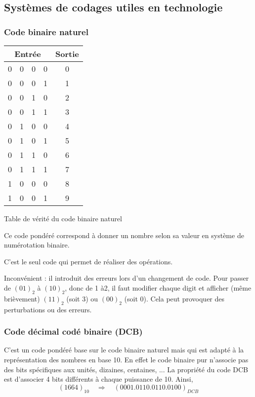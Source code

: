 \subsection{Systèmes de codages utiles en technologie} 

\subsubsection{Code binaire naturel}

\begin{margintable}
\begin{tabular}{|c|c|c|c||c|}
\hline
\multicolumn{4}{|c||}{Entrée} & Sortie \\ \hline \hline
0 & 0 & 0 & 0 & 0 \\ \hline 
0 & 0 & 0 & 1 & 1 \\ \hline
0 & 0 & 1 & 0 & 2 \\ \hline
0 & 0 & 1 & 1 & 3 \\ \hline
0 & 1 & 0 & 0 & 4 \\ \hline
0 & 1 & 0 & 1 & 5 \\ \hline
0 & 1 & 1 & 0 & 6 \\ \hline
0 & 1 & 1 & 1 & 7 \\ \hline
1 & 0 & 0 & 0 & 8 \\ \hline
1 & 0 & 0 & 1 & 9 \\ \hline
\end{tabular}
\caption{Table de vérité du code binaire naturel}

\end{margintable}


Ce code pondéré correspond à donner un nombre selon sa valeur en système de numérotation binaire. 

C'est le seul code qui permet de réaliser des opérations. 

Inconvénient : il introduit des erreurs lors d'un changement de code. Pour passer de $(01)_2$ à $(10)_2$, donc de 1 à2, il faut modifier chaque digit et afficher (même brièvement) $(11)_2$ (soit 3) ou $(00)_2$ (soit 0). Cela peut provoquer des perturbations ou des erreurs. 


%



\subsubsection{Code décimal codé binaire (DCB)}
C'est un code pondéré base sur le code binaire naturel mais qui est adapté à la représentation des nombres en base 10. En effet le code binaire pur n'associe pas des bits spécifiques aux unités, dizaines, centaines, ... La propriété du code DCB est d'associer 4 bits différents à chaque puissance de 10. Ainsi, 
$$
(1664)_{10} \quad \Longrightarrow \quad  (0001.0110.0110.0100)_{DCB}
$$

